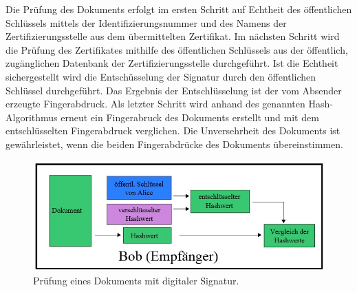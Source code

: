 Die Prüfung des Dokuments erfolgt im ersten Schritt auf Echtheit des öffentlichen Schlüssels mittels der Identifizierungsnummer und des Namens der Zertifizierungsstelle aus dem übermittelten Zertifikat. Im nächsten Schritt wird die Prüfung des Zertifikates mithilfe des öffentlichen Schlüssels aus der öffentlich, zugänglichen Datenbank der Zertifizierungsstelle durchgeführt. Ist die Echtheit sichergestellt wird die Entschüsselung der Signatur durch den öffentlichen Schlüssel durchgeführt. Das Ergebnis der Entschlüsselung ist der vom Absender erzeugte Fingerabdruck. Als letzter Schritt wird anhand des genannten Hash-Algorithmus erneut ein Fingerabruck des Dokuments erstellt und mit dem entschlüsselten Fingerabdruck verglichen. Die Unversehrheit des Dokuments ist gewährleistet, wenn die beiden Fingerabdrücke des Dokuments übereinstimmen. \cite{techno1}
\begin{figure}[!ht]
    \centering
    \includegraphics[width=\textwidth]{PruefungEmpfaenger2.jpg}
    \caption[Prüfung eines Dokuments mit digitaler Signatur]{\small{Prüfung eines Dokuments mit digitaler Signatur. \cite{techno3}}}
    \label{fig:3}
\end{figure}